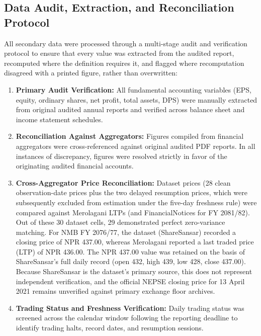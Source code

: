 \subsection{Data Audit, Extraction, and Reconciliation Protocol}
All secondary data were processed through a multi-stage audit and verification protocol to ensure that every value was extracted from the audited report, recomputed where the definition requires it, and flagged where recomputation disagreed with a printed figure, rather than overwritten:
\begin{enumerate}
    \item \textbf{Primary Audit Verification:} All fundamental accounting variables (EPS, equity, ordinary shares, net profit, total assets, DPS) were manually extracted from original audited annual reports and verified across balance sheet and income statement schedules.
    \item \textbf{Reconciliation Against Aggregators:} Figures compiled from financial aggregators were cross-referenced against original audited PDF reports. In all instances of discrepancy, figures were resolved strictly in favor of the originating audited financial accounts.
    \item \textbf{Cross-Aggregator Price Reconciliation:} Dataset prices (28 clean observation-date prices plus the two delayed resumption prices, which were subsequently excluded from estimation under the five-day freshness rule) were compared against Merolagani LTPs (and FinancialNotices for FY 2081/82). Out of these 30 dataset cells, 29 demonstrated perfect zero-variance matching. For NMB FY 2076/77, the dataset (ShareSansar) recorded a closing price of NPR 437.00, whereas Merolagani reported a last traded price (LTP) of NPR 436.00. The NPR 437.00 value was retained on the basis of ShareSansar's full daily record (open 432, high 439, low 428, close 437.00). Because ShareSansar is the dataset's primary source, this does not represent independent verification, and the official NEPSE closing price for 13 April 2021 remains unverified against primary exchange floor archives.
    \item \textbf{Trading Status and Freshness Verification:} Daily trading status was screened across the calendar window following the reporting deadline to identify trading halts, record dates, and resumption sessions.

\end{enumerate}
